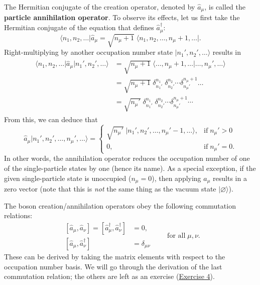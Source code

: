 \documentclass[pra,12pt]{revtex4}
\begin{document}
The Hermitian conjugate of the creation operator, denoted by $\hat{a}_\mu$,
is called the \textbf{particle annihilation operator}.  To observe its
effects, let us first take the Hermitian conjugate of the equation
that defines $\hat{a}_\mu^\dagger$:
\begin{equation}
  \big\langle n_1, n_2, \dots\big| \hat{a}_\mu = \sqrt{n_\mu+1} \; \big\langle n_1, n_2, \dots, n_\mu + 1, \dots\big|.
\end{equation}
Right-multiplying by another occupation number state
$|n_1',n_2',\dots\rangle$ results in
\begin{align}
  \begin{aligned}\big\langle n_1, n_2, \dots \big| \hat{a}_\mu \big|n_1',n_2',\dots\big\rangle &= \sqrt{n_\mu+1} \; \big\langle \dots, n_\mu + 1, \dots\big| \dots, n_\mu',\dots\big\rangle \\&= \sqrt{n_\mu+1}\; \delta^{n_1}_{n_1'}\; \delta^{n_2}_{n_2'} \cdots \delta^{n_\mu+1}_{n_\mu'} \dots \\  &= \sqrt{n_\mu'}\; \delta^{n_1}_{n_1'}\; \delta^{n_2}_{n_2'} \cdots \delta^{n_\mu+1}_{n_\mu'}\cdots\end{aligned}
  \end{align}
From this, we can deduce that
\begin{equation}
  \hat{a}_\mu \big|n_1', n_2', \dots, n_\mu', \dots\big\rangle = \begin{cases} \sqrt{n_\mu'} \; \big|n_1', n_2', \dots, n_\mu' - 1, \dots\big\rangle, & \mathrm{if}\; n_\mu' > 0 \\ 0, & \mathrm{if}\; n_\mu' = 0.\end{cases}
\end{equation}
In other words, the annihilation operator reduces the occupation
number of one of the single-particle states by one (hence its name).
As a special exception, if the given single-particle state is
unoccupied ($n_\mu = 0$), then applying $\hat{a}_\mu$ results in a zero
vector (note that this is \textit{not} the same thing as the vacuum
state $|\varnothing\rangle$).

The boson creation/annihilation operators obey the following
commutation relations:
$$\boxed{\quad\begin{aligned}\,[\hat{a}_\mu,\hat{a}_\nu] = [\hat{a}_\mu^\dagger,\hat{a}_\nu^\dagger] &= 0, \\ \,[\hat{a}_\mu,\hat{a}_\nu^\dagger] &= \delta_{\mu\nu}\end{aligned}\qquad\textrm{for all}\;\mu,\nu.\quad}$$
These can be derived by taking the matrix elements with respect to the
occupation number basis.  We will go through the derivation of the
last commutation relation; the others are left as an exercise
(\hyperref[ex:boson_commutators]{Exercise 4}).
\end{document}
